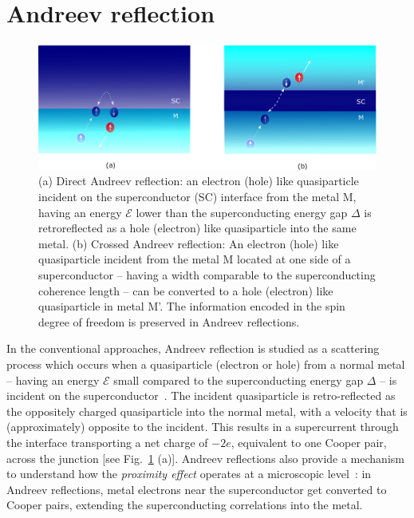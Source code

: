 \documentclass[10pt,letterpaper,aps,onecolumn,superscriptaddress,floatfix,notitlepage]{revtex4-1}
\begin{document}
	\section{Andreev reflection\label{sec2}} 
	\begin{figure}
		\includegraphics[scale=0.4]{fig2.eps}
		\caption{(a) Direct Andreev reflection: an electron (hole) like quasiparticle incident on the superconductor (SC) interface from the metal M, having an energy $\mathcal{E}$ lower than the superconducting energy gap $\Delta$ is retroreflected as a hole (electron) like quasiparticle into the same metal. (b) Crossed Andreev reflection: An electron (hole) like quasiparticle incident from the metal M located at one side of a superconductor -- having a width comparable to the superconducting coherence length -- can be converted to a hole (electron) like quasiparticle in metal M'. The information encoded in the spin degree of freedom is preserved in Andreev reflections.\label{dca}}
	\end{figure} 
	In the conventional approaches, Andreev reflection is studied as a scattering process which occurs when a quasiparticle (electron or hole) from a normal metal -- having an energy $\mathcal{E}$ small compared to the superconducting energy gap $\Delta$ -- is incident on the superconductor~\cite{andreev,Pannet,spintron,artemenko1978excess,artemenko1979theory,artemenko1979excess,zaitsev1980theory}. The incident quasiparticle is retro-reflected as the oppositely charged quasiparticle into the normal metal, with a velocity that is (approximately) opposite to the incident. This results in a supercurrent through the interface transporting a net charge of $-2e$, equivalent to one Cooper pair, across the junction [see Fig.~\ref{dca} (a)].
	Andreev reflections also provide a mechanism to understand how the \textit{proximity effect} operates at a microscopic level~\cite{Pannet,proximity2004}: in Andreev reflections, metal electrons near the superconductor get converted to Cooper pairs, extending the superconducting correlations into the metal.
	
\end{document}
